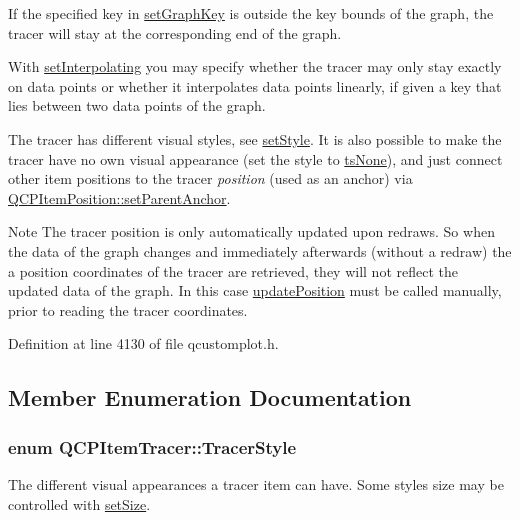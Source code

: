 If the specified key in \hyperlink{class_q_c_p_item_tracer_a6840143b42f3b685cedf7c6d83a704c8}{set\+Graph\+Key} is outside the key bounds of the graph, the tracer will stay at the corresponding end of the graph.

With \hyperlink{class_q_c_p_item_tracer_a6c244a9d1175bef12b50afafd4f5fcd2}{set\+Interpolating} you may specify whether the tracer may only stay exactly on data points or whether it interpolates data points linearly, if given a key that lies between two data points of the graph.

The tracer has different visual styles, see \hyperlink{class_q_c_p_item_tracer_a41a2ac4f1acd7897b4e2a2579c03204e}{set\+Style}. It is also possible to make the tracer have no own visual appearance (set the style to \hyperlink{class_q_c_p_item_tracer_a2f05ddb13978036f902ca3ab47076500aac27462c79146225bfa8fba24d2ee8a4}{ts\+None}), and just connect other item positions to the tracer {\itshape position} (used as an anchor) via \hyperlink{class_q_c_p_item_position_ac094d67a95d2dceafa0d50b9db3a7e51}{Q\+C\+P\+Item\+Position\+::set\+Parent\+Anchor}.

\begin{DoxyNote}{Note}
The tracer position is only automatically updated upon redraws. So when the data of the graph changes and immediately afterwards (without a redraw) the a position coordinates of the tracer are retrieved, they will not reflect the updated data of the graph. In this case \hyperlink{class_q_c_p_item_tracer_a5b90296109e36384aedbc8908a670413}{update\+Position} must be called manually, prior to reading the tracer coordinates. 
\end{DoxyNote}


Definition at line 4130 of file qcustomplot.\+h.



\subsection{Member Enumeration Documentation}
\hypertarget{class_q_c_p_item_tracer_a2f05ddb13978036f902ca3ab47076500}{}
\subsubsection[{Tracer\+Style}]{\setlength{\rightskip}{0pt plus 5cm}enum {\bf Q\+C\+P\+Item\+Tracer\+::\+Tracer\+Style}}\label{class_q_c_p_item_tracer_a2f05ddb13978036f902ca3ab47076500}
The different visual appearances a tracer item can have. Some styles size may be controlled with \hyperlink{class_q_c_p_item_tracer_ae47fe0617f5fef5fdb766999569be10a}{set\+Size}.

